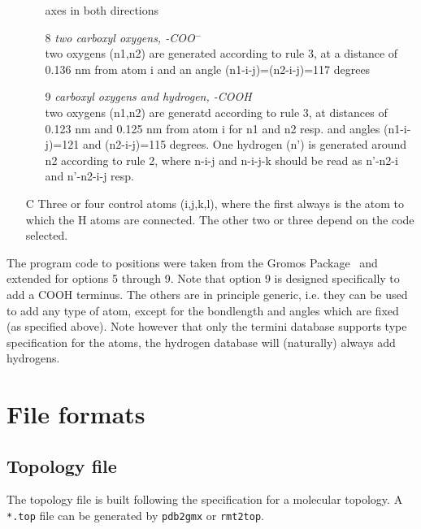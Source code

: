 \begin{itemize}
\begin{enumerate}
axes in both directions
\item[8]{\em two carboxyl oxygens, -COO{$^-$}}\\
two oxygens (n1,n2) are generated according to rule 3, at a distance
of 0.136 nm from atom i and an angle (n1-i-j)=(n2-i-j)=117 degrees
\item[9]{\em carboxyl oxygens and hydrogen, -COOH}\\
two oxygens (n1,n2) are generatd according to rule 3, at distances of
0.123 nm and 0.125 nm from atom i for n1 and n2 resp. and angles
(n1-i-j)=121 and (n2-i-j)=115 degrees. One hydrogen (n') is generated
around n2 according to rule 2, where n-i-j and n-i-j-k should be read
as n'-n2-i and n'-n2-i-j resp.
\end{enumerate}
\item[C]
Three or four control atoms (i,j,k,l), where the first always is the
atom to which the H atoms are connected. The other two or three depend
on the code selected.
\end{itemize}

The program code to  positions were taken
from the Gromos Package~\cite{biomos} and extended for options 5
through 9. Note that option 9 is designed specifically to add a COOH
terminus. The others are in principle generic, i.e. they can be used
to add any type of atom, except for the bondlength and angles which
are fixed (as specified above). Note however that only the termini
database supports type specification for the atoms, the hydrogen
database will (naturally) always add hydrogens.

\section{File formats}
\subsection{Topology file}
\label{subsec:topfile}
The topology file is built following the {\gromacs} specification for a
molecular topology.  A \verb'*.top' file can be generated by
\verb'pdb2gmx' or \verb'rmt2top'.

